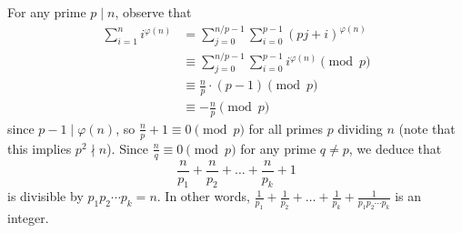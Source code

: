 For any prime $p\mid n$, observe that
\begin{align*}
	\sum_{i=1}^ni^{\varphi(n)}&=\sum_{j=0}^{n/p-1}\sum_{i=0}^{p-1}(pj+i)^{\varphi(n)}\\
	&\equiv\sum_{j=0}^{n/p-1}\sum_{i=0}^{p-1}i^{\varphi(n)}\pmod p\\
	&\equiv\frac{n}{p}\cdot\left(p-1\right)\pmod p\\
	&\equiv-\frac{n}{p}\pmod p
\end{align*}
since $p-1\mid\varphi(n)$, so $\frac{n}{p}+1\equiv0\pmod p$ for all primes $p$ dividing $n$ (note that this implies $p^2\nmid n$). Since $\frac{n}{q}\equiv0\pmod p$ for any prime $q\neq p$, we deduce that \[\frac{n}{p_1}+\frac{n}{p_2}+\ldots+\frac{n}{p_k}+1\] is divisible by $p_1p_2\cdots p_k=n$. In other words, $\frac{1}{p_1}+\frac{1}{p_2}+\ldots+\frac{1}{p_k}+\frac{1}{p_1p_2\cdots p_k}$ is an integer.